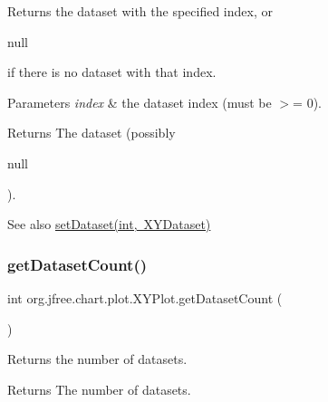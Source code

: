 Returns the dataset with the specified index, or
\begin{DoxyCode}
null 
\end{DoxyCode}
 if there is no dataset with that index.


\begin{DoxyParams}{Parameters}
{\em index} & the dataset index (must be $>$= 0).\\
\hline
\end{DoxyParams}
\begin{DoxyReturn}{Returns}
The dataset (possibly
\begin{DoxyCode}
null 
\end{DoxyCode}
 ).
\end{DoxyReturn}
\begin{DoxySeeAlso}{See also}
\mbox{\hyperlink{classorg_1_1jfree_1_1chart_1_1plot_1_1_x_y_plot_a7a36700f3f8bf8484c75f2f195e0daf2}{set\+Dataset(int, X\+Y\+Dataset)}} 
\end{DoxySeeAlso}
\mbox{\label{classorg_1_1jfree_1_1chart_1_1plot_1_1_x_y_plot_a68940382eb77b44df32658d540645a2c}} 
\subsubsection{\texorpdfstring{get\+Dataset\+Count()}{getDatasetCount()}}
{\footnotesize\ttfamily int org.\+jfree.\+chart.\+plot.\+X\+Y\+Plot.\+get\+Dataset\+Count (\begin{DoxyParamCaption}{ }\end{DoxyParamCaption})}

Returns the number of datasets.

\begin{DoxyReturn}{Returns}
The number of datasets. 
\end{DoxyReturn}
\mbox{\label{classorg_1_1jfree_1_1chart_1_1plot_1_1_x_y_plot_a09cd7f85a32d373cbe5ceb73e90c86ed}} 
